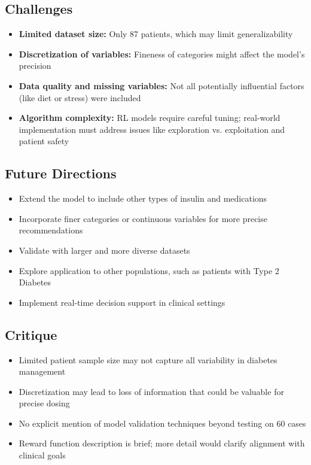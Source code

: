 \subsection*{Challenges}
\begin{itemize}
    \item \textbf{Limited dataset size:} Only 87 patients, which may limit generalizability
    \item \textbf{Discretization of variables:} Fineness of categories might affect the model's precision
    \item \textbf{Data quality and missing variables:} Not all potentially influential factors (like diet or stress) were included
    \item \textbf{Algorithm complexity:} RL models require careful tuning; real-world implementation must address issues like exploration vs. exploitation and patient safety
\end{itemize}

\subsection*{Future Directions}
\begin{itemize}
    \item Extend the model to include other types of insulin and medications
    \item Incorporate finer categories or continuous variables for more precise recommendations
    \item Validate with larger and more diverse datasets
    \item Explore application to other populations, such as patients with Type 2 Diabetes
    \item Implement real-time decision support in clinical settings
\end{itemize}

\subsection*{Critique}
\begin{itemize}
    \item Limited patient sample size may not capture all variability in diabetes management
    \item Discretization may lead to loss of information that could be valuable for precise dosing
    \item No explicit mention of model validation techniques beyond testing on 60 cases
    \item Reward function description is brief; more detail would clarify alignment with clinical goals
\end{itemize}

